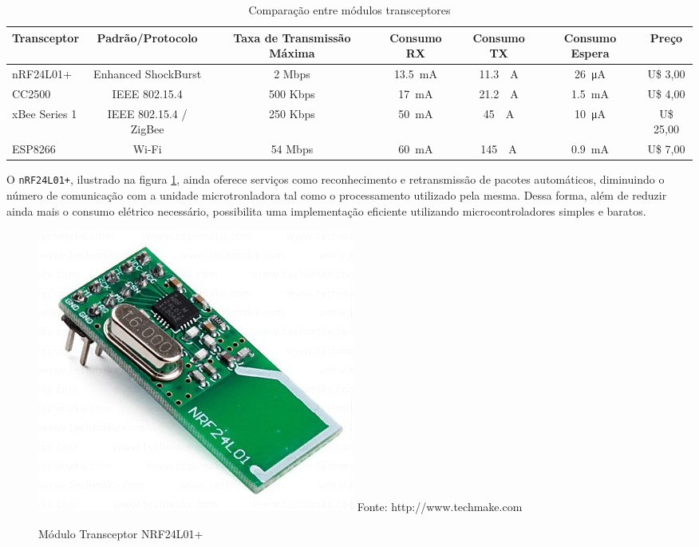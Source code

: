 \begin{table}[H]
	\centering
	\resizebox{\textwidth}{!} {
		\begin{tabular}{|l|c|c|c|c|c|c|}
		\hline
		Transceptor   & Padrão/Protocolo       & Taxa de Transmissão Máxima & Consumo RX & Consumo TX &
		Consumo Espera & Preço     \\ \hline \hline
		nRF24L01+     & Enhanced ShockBurst    & 2 Mbps   & \SI{13.5}{\milli \ampere} & \SI{11.3}{\milli
		\ampere} & \SI{26}{\micro \ampere} & U\$ 3,00  \\ \hline
		CC2500        & IEEE 802.15.4          & 500 Kbps & \SI{17}{\milli \ampere}   & \SI{21.2} {\milli
		\ampere}  & \SI{1.5}{\milli \ampere} & U\$ 4,00  \\ \hline
		xBee Series 1 & IEEE 802.15.4 / ZigBee & 250 Kbps & \SI{50}{\milli \ampere}   & \SI{45}{\milli
		\ampere} & \SI{10}{\micro \ampere}  & U\$ 25,00 \\ \hline
		ESP8266       & Wi-Fi                  & 54 Mbps  & \SI{60}{\milli \ampere}   & \SI{145}{\milli
		\ampere} & \SI{0.9}{\milli \ampere}& U\$ 7,00  \\ \hline
		\end{tabular}
	}
	\caption{Comparação entre módulos transceptores}
	\label{quadro:transceivers}
\end{table}

O \texttt{nRF24L01+}, ilustrado na figura \ref{figura:nrf}, ainda oferece serviços como reconhecimento e
retransmissão de pacotes automáticos, diminuindo o número de comunicação com a unidade microtronladora tal
como o processamento utilizado pela mesma. Dessa forma, além de reduzir ainda mais o consumo elétrico
necessário, possibilita uma implementação eficiente utilizando microcontroladores simples e baratos.

\begin{figure}[h]
	\caption{Módulo Transceptor NRF24L01+}
	\centering
	\includegraphics[scale=0.25]{../images/nrf.jpg}
	\hspace{\linewidth}
	Fonte: http://www.techmake.com
	\label{figura:nrf}
\end{figure}

